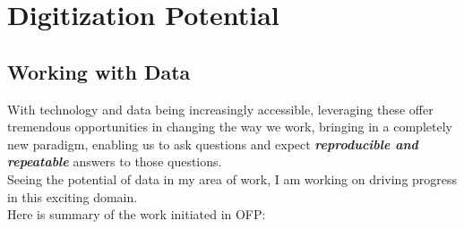 \documentclass[11pt, a4paper]{awesome-cv}
\begin{document}
\hypertarget{digitization-potential}{%
\section{Digitization Potential}\label{digitization-potential}}

\hypertarget{working-with-data}{%
\subsection{Working with Data}\label{working-with-data}}

With technology and data being increasingly accessible, leveraging these
offer tremendous opportunities in changing the way we work, bringing in
a completely new paradigm, enabling us to ask questions and expect
\textbf{\emph{reproducible and repeatable}} answers to those
questions.\\
Seeing the potential of data in my area of work, I am working on driving
progress in this exciting domain.\\
Here is summary of the work initiated in OFP:
\end{document}
